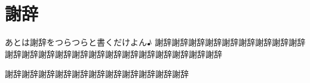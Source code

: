 \chapter*{謝辞}

あとは謝辞をつらつらと書くだけよん♪
謝辞謝辞謝辞謝辞謝辞謝辞謝辞謝辞謝辞謝辞謝辞謝辞謝辞謝辞謝辞謝辞謝辞謝辞謝辞謝辞謝辞謝辞


謝辞謝辞謝辞謝辞謝辞謝辞謝辞謝辞謝辞謝辞謝辞
